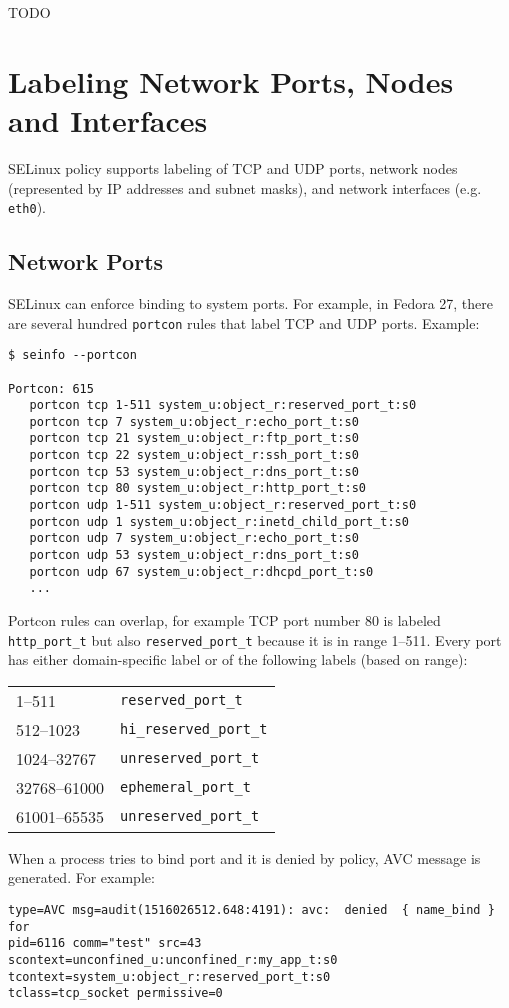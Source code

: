 TODO

\section{Labeling Network Ports, Nodes and Interfaces}
SELinux policy supports labeling of TCP and UDP ports, network nodes
(represented by IP addresses and subnet masks), and network interfaces (e.g.
\texttt{eth0}).

\subsection{Network Ports}
SELinux can enforce binding to system ports. For example, in Fedora 27, there
are several hundred \texttt{portcon} rules that label TCP and UDP ports.
Example:
\begin{lstlisting}
$ seinfo --portcon

Portcon: 615
   portcon tcp 1-511 system_u:object_r:reserved_port_t:s0
   portcon tcp 7 system_u:object_r:echo_port_t:s0
   portcon tcp 21 system_u:object_r:ftp_port_t:s0
   portcon tcp 22 system_u:object_r:ssh_port_t:s0
   portcon tcp 53 system_u:object_r:dns_port_t:s0
   portcon tcp 80 system_u:object_r:http_port_t:s0
   portcon udp 1-511 system_u:object_r:reserved_port_t:s0
   portcon udp 1 system_u:object_r:inetd_child_port_t:s0
   portcon udp 7 system_u:object_r:echo_port_t:s0
   portcon udp 53 system_u:object_r:dns_port_t:s0
   portcon udp 67 system_u:object_r:dhcpd_port_t:s0
   ...
\end{lstlisting}
Portcon rules can overlap, for example TCP port number 80 is labeled
\texttt{http\_port\_t} but also \texttt{reserved\_port\_t} because it is in range
1--511. Every port has either domain-specific label or of the following labels
(based on range):

\begin{tabular}{l l}
    1--511 & \texttt{reserved\_port\_t} \\
    512--1023 & \texttt{hi\_reserved\_port\_t} \\
    1024--32767 & \texttt{unreserved\_port\_t} \\
    32768--61000 & \texttt{ephemeral\_port\_t} \\
    61001--65535 & \texttt{unreserved\_port\_t} \\
\end{tabular}

When a process tries to bind port and it is denied by policy, AVC message is
generated. For example:
\begin{lstlisting}
type=AVC msg=audit(1516026512.648:4191): avc:  denied  { name_bind } for
pid=6116 comm="test" src=43 scontext=unconfined_u:unconfined_r:my_app_t:s0
tcontext=system_u:object_r:reserved_port_t:s0
tclass=tcp_socket permissive=0
\end{lstlisting}

